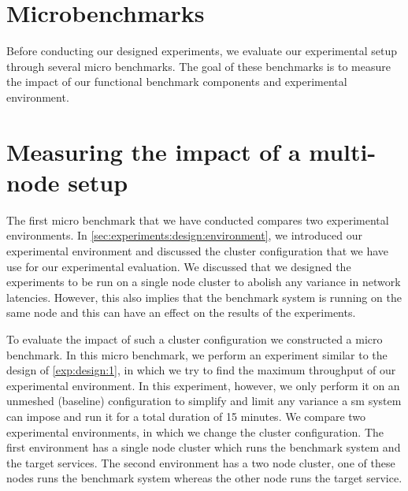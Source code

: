 \section{Microbenchmarks}
\label{sec:experiments:microbenchmarks}

Before conducting our designed experiments, we evaluate our experimental setup through several micro benchmarks. The goal of these benchmarks is to measure the impact of our functional benchmark components and experimental environment.


\section{Measuring the impact of a multi-node setup}
\label{sec:experiments:microbenchmarks:node-count}

The first micro benchmark that we have conducted compares two experimental environments. In \cref{sec:experiments:design:environment}, we introduced our experimental environment and discussed the cluster configuration that we have use for our experimental evaluation. We discussed that we designed the experiments to be run on a single node cluster to abolish any variance in network latencies. However, this also implies that the benchmark system is running on the same node and this can have an effect on the results of the experiments.

To evaluate the impact of such a cluster configuration we constructed a micro benchmark. In this micro benchmark, we perform an experiment similar to the design of \ref{exp:design:1}, in which we try to find the maximum throughput of our experimental environment. In this experiment, however, we only perform it on an unmeshed (baseline) configuration to simplify and limit any variance a \gls{sm} system can impose and run it for a total duration of 15 minutes. We compare two experimental environments, in which we change the cluster configuration. The first environment has a single node cluster which runs the benchmark system and the target services. The second environment has a two node cluster, one of these nodes runs the benchmark system whereas the other node runs the target service.


